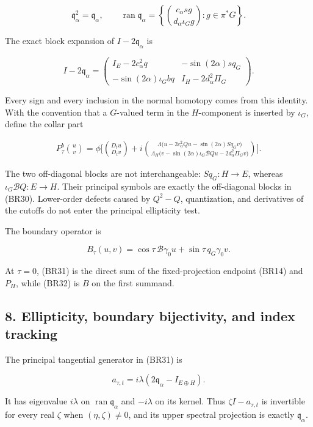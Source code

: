 \documentclass[
  11pt,
]{article}
\begin{document}
\[
 \mathfrak q_\alpha^2=\mathfrak q_\alpha,\qquad
 \operatorname{ran}\mathfrak q_\alpha
 =\left\{
 \binom{c_\alpha sg}{d_\alpha\iota_Gg}:g\in\pi^*G
 \right\}.
 \tag{BR29}
\]

The exact block expansion of \(I-2\mathfrak q_\alpha\) is

\[
 I-2\mathfrak q_\alpha=
 \begin{pmatrix}
 I_E-2c_\alpha^2q&-\sin(2\alpha)sq_G\\
 -\sin(2\alpha)\iota_Gbq&I_H-2d_\alpha^2\Pi_G
 \end{pmatrix}.
 \tag{BR30}
\]

Every sign and every inclusion in the normal homotopy comes from this
identity. With the convention that a \(G\)-valued term in the
\(H\)-component is inserted by \(\iota_G\), define the collar part

\[
 \begin{aligned}
 P_\tau^b\binom{u}{v}
 =\phi\Bigg[
 \binom{D_tu}{D_tv}
 +i\binom{
 \Lambda\bigl(u-2c_\alpha^2Qu-\sin(2\alpha)S q_Gv\bigr)}
 {\Lambda_H\bigl(v-\sin(2\alpha)\iota_G\mathcal BQu
                    -2d_\alpha^2\Pi_Gv\bigr)}
 \Bigg].
 \end{aligned}
 \tag{BR31}
\]

The two off-diagonal blocks are not interchangeable: \(Sq_G:H\to E\),
whereas \(\iota_G\mathcal BQ:E\to H\). Their principal symbols are
exactly the off-diagonal blocks in (BR30). Lower-order defects caused by
\(Q^2-Q\), quantization, and derivatives of the cutoffs do not enter the
principal ellipticity test.

The boundary operator is

\[
 B_\tau(u,v)
 =\cos\tau\,\mathcal B\gamma_0u
  +\sin\tau\,q_G\gamma_0v .
 \tag{BR32}
\]

At \(\tau=0\), (BR31) is the direct sum of the fixed-projection endpoint
(BR14) and \(P_H\), while (BR32) is \(B\) on the first summand.

\subsection{8. Ellipticity, boundary bijectivity, and index
tracking}\label{ellipticity-boundary-bijectivity-and-index-tracking}

The principal tangential generator in (BR31) is

\[
 a_{\tau,t}=i\lambda(2\mathfrak q_\alpha-I_{E\oplus H}) .
 \tag{BR33}
\]

It has eigenvalue \(i\lambda\) on
\(\operatorname{ran}\mathfrak q_\alpha\) and \(-i\lambda\) on its
kernel. Thus \(\zeta I-a_{\tau,t}\) is invertible for every real
\(\zeta\) when \((\eta,\zeta)\ne0\), and its upper spectral projection
is exactly \(\mathfrak q_\alpha\).
\end{document}
